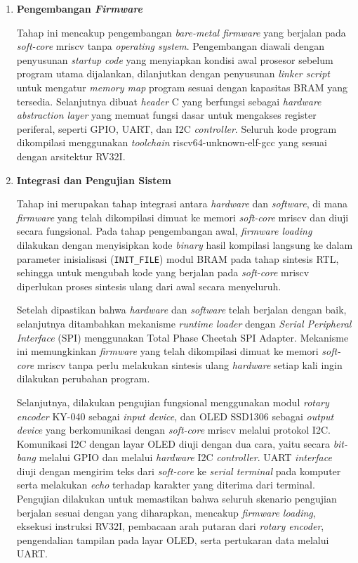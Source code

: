 \begin{enumerate}
	\item \textbf{Pengembangan \textit{Firmware}}

	Tahap ini mencakup pengembangan \textit{bare-metal firmware} yang berjalan pada \textit{soft-core} mriscv tanpa \textit{operating system}. Pengembangan diawali dengan penyusunan \textit{startup code} yang menyiapkan kondisi awal prosesor sebelum program utama dijalankan, dilanjutkan dengan penyusunan \textit{linker script} untuk mengatur \textit{memory map} program sesuai dengan kapasitas BRAM yang tersedia. Selanjutnya dibuat \textit{header} C yang berfungsi sebagai \textit{hardware abstraction layer} yang memuat fungsi dasar untuk mengakses register periferal, seperti GPIO, UART, dan I2C \textit{controller}. Seluruh kode program dikompilasi menggunakan \textit{toolchain} riscv64-unknown-elf-gcc yang sesuai dengan arsitektur RV32I.

	\item \textbf{Integrasi dan Pengujian Sistem}

	Tahap ini merupakan tahap integrasi antara \textit{hardware} dan \textit{software}, di mana \textit{firmware} yang telah dikompilasi dimuat ke memori \textit{soft-core} mriscv dan diuji secara fungsional. Pada tahap pengembangan awal, \textit{firmware loading} dilakukan dengan menyisipkan kode \textit{binary} hasil kompilasi langsung ke dalam parameter inisialisasi (\texttt{INIT\_FILE}) modul BRAM pada tahap sintesis RTL, sehingga untuk mengubah kode yang berjalan pada \textit{soft-core} mriscv diperlukan proses sintesis ulang dari awal secara menyeluruh.

	Setelah dipastikan bahwa \textit{hardware} dan \textit{software} telah berjalan dengan baik, selanjutnya ditambahkan mekanisme \textit{runtime loader} dengan \textit{Serial Peripheral Interface} (SPI) menggunakan Total Phase Cheetah SPI Adapter. Mekanisme ini memungkinkan \textit{firmware} yang telah dikompilasi dimuat ke memori \textit{soft-core} mriscv tanpa perlu melakukan sintesis ulang \textit{hardware} setiap kali ingin dilakukan perubahan program.

	Selanjutnya, dilakukan pengujian fungsional menggunakan modul \textit{rotary encoder} KY-040 sebagai \textit{input device}, dan OLED SSD1306 sebagai \textit{output device} yang berkomunikasi dengan \textit{soft-core} mriscv melalui protokol I2C. Komunikasi I2C dengan layar OLED diuji dengan dua cara, yaitu secara \textit{bit-bang} melalui GPIO dan melalui \textit{hardware} I2C \textit{controller}. UART \textit{interface} diuji dengan mengirim teks dari \textit{soft-core} ke \textit{serial terminal} pada komputer serta melakukan \textit{echo} terhadap karakter yang diterima dari terminal. Pengujian dilakukan untuk memastikan bahwa seluruh skenario pengujian berjalan sesuai dengan yang diharapkan, mencakup \textit{firmware loading}, eksekusi instruksi RV32I, pembacaan arah putaran dari \textit{rotary encoder}, pengendalian tampilan pada layar OLED, serta pertukaran data melalui UART.


\end{enumerate}
